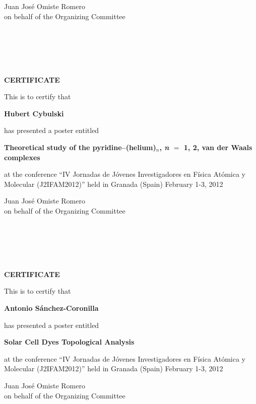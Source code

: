 \documentclass [13pt,a4paper] {letter}
\begin{document}
\begin{raggedleft}
Juan José Omiste Romero \\
on behalf of the Organizing Committee
\newpage
\end{raggedleft}
\begin{verbatim}





\end{verbatim}
\pagestyle{empty}
\begin{center}
{\bf {\Huge CERTIFICATE}}

\vspace {1.5cm}
This is to certify that
\vspace {1cm}

{\bf \Large  Hubert    Cybulski }
\vspace {1cm}

has presented a poster entitled
\vspace {1cm}

{\bf \large  Theoretical study of the pyridine--(helium)$_{n}$, \textit{n} $=$ 1, 2, van der Waals complexes }
\vspace {1cm}

at the conference { \textquotedblleft IV Jornadas de Jóvenes Investigadores en Física Atómica y Molecular (J2IFAM2012)\textquotedblright} 
held in Granada (Spain) February 1-3, 2012
\end{center}
\vspace {3cm}
\begin{raggedleft}
Juan José Omiste Romero \\
on behalf of the Organizing Committee
\newpage
\end{raggedleft}
\begin{verbatim}





\end{verbatim}
\pagestyle{empty}
\begin{center}
{\bf {\Huge CERTIFICATE}}

\vspace {1.5cm}
This is to certify that
\vspace {1cm}

{\bf \Large  Antonio    Sánchez-Coronilla }
\vspace {1cm}

has presented a poster entitled
\vspace {1cm}

{\bf \large  Solar Cell Dyes Topological Analysis  }
\vspace {1cm}

at the conference { \textquotedblleft IV Jornadas de Jóvenes Investigadores en Física Atómica y Molecular (J2IFAM2012)\textquotedblright} 
held in Granada (Spain) February 1-3, 2012
\end{center}
\vspace {3cm}
\begin{raggedleft}
Juan José Omiste Romero \\
on behalf of the Organizing Committee
\newpage
\end{raggedleft}
\end{document}
